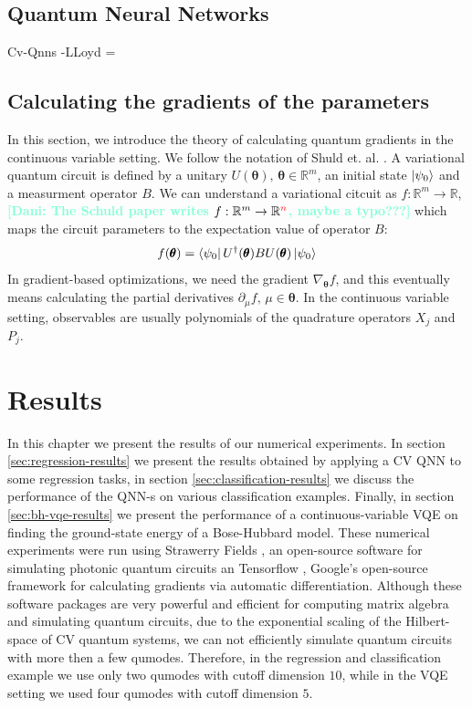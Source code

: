 \documentclass[12pt, a4paper,  nobibnotes]{article}
\newcommand{\red}[1]{\textcolor{red}{#1}}
\newcommand{\nd}[1]{\textcolor{Aquamarine}{\textbf{[Dani: #1]}}}
\begin{document}
\subsection{Quantum Neural Networks}
\label{sec:qnn}
Cv-Qnns -LLoyd = \cite{CVQNNLLoyd}
\subsection{Calculating the gradients of the parameters}
\label{sec:qgrad}
In this section, we introduce the theory of calculating quantum gradients in the continuous variable setting. 
We follow the notation of Shuld et. al. \cite{AnalyticGradientsSchuld}. A variational quantum circuit is 
defined by a unitary $U(\pmb\theta),\, \pmb\theta\in\mathbb{R}^m$, an initial state $\ket{\psi_0}$ and a measurment 
operator $B$. We can understand a variational citcuit as $f:\mathbb{R}^m \rightarrow \mathbb{R}$, \nd{The Schuld paper writes $f:\mathbb{R}^m \rightarrow \mathbb{R}^{\red n}$, maybe a typo???} 
which maps the circuit parameters to the expectation value of operator $B$:
\begin{equation}
    f(\pmb\theta) = \bra{\psi_0}U^{\dagger}(\pmb\theta) B U(\pmb\theta)\ket{\psi_0}   
\end{equation}
In gradient-based optimizations, we need the gradient $\nabla_{\pmb\theta} f$, and this eventually means calculating the partial derivatives
$\partial_{\mu}f,\,\mu\in\pmb\theta$. In the continuous variable setting, observables are usually polynomials of the quadrature operators $X_j$ and $P_j$.



\section{Results}
In this chapter we present the results of our numerical experiments. In section 
\ref{sec:regression-results} we present the results obtained by applying a CV QNN to some 
regression tasks, in section \ref{sec:classification-results} we discuss the performance of 
the QNN-s on various classification examples. Finally, in section \ref{sec:bh-vqe-results}
we present the performance of a continuous-variable VQE on finding the ground-state energy 
of a Bose-Hubbard model. These numerical experiments were run using 
Strawerry Fields \cite{Killoran2019strawberryfields, ApplicationsOfStrawberryFields}, an 
open-source software for simulating photonic quantum circuits an Tensorflow \cite{abadi2016tensorflow},
Google's open-source framework for calculating gradients via automatic differentiation. Although
these software packages are very powerful and efficient for computing matrix algebra and 
simulating quantum circuits, due to the exponential scaling of the Hilbert-space of CV quantum 
systems, we can not efficiently simulate quantum circuits with more then a few qumodes. Therefore, 
in the regression and classification example we use only two qumodes with cutoff dimension $10$,
while in the VQE setting we used four qumodes with cutoff dimension $5$.
\end{document}
